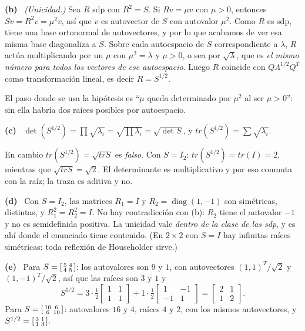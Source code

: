 \documentclass[11pt,a4paper]{article}
\newcommand{\bi}[1]{\boldsymbol{#1}}
\newcommand{\n}[1]{\boldsymbol{#1}}
\DeclareMathOperator{\gen}{span}
\DeclareMathOperator{\tr}{tr}
\DeclareMathOperator{\rg}{rg}
\DeclareMathOperator{\diag}{diag}
\def\n#1{#1}\def\bi#1{#1}\def\rg{rg}\def\tr{tr}\def\gen{span}%
\newcommand{\itemsol}[1]{\par\medskip\noindent\textbf{(#1)}\ \ignorespaces}
\begin{document}
\itemsol{b} \emph{(Unicidad.)} Sea $R$ sdp con $R^2=S$. Si $R\n v=\mu\n v$ con
$\mu>0$, entonces $S\n v=R^2\n v=\mu^2\n v$, así que $\n v$ es autovector de $S$
con autovalor $\mu^2$. Como $R$ es sdp, tiene una base ortonormal de
autovectores, y por lo que acabamos de ver esa misma base diagonaliza a $S$.
Sobre cada autoespacio de $S$ correspondiente a $\lambda$, $R$ actúa
multiplicando por un $\mu$ con $\mu^2=\lambda$ y $\mu>0$, o sea por
$\sqrt\lambda$, que es \emph{el mismo número para todos los vectores de ese
autoespacio}. Luego $R$ coincide con $Q\Lambda^{1/2}Q^T$ como transformación
lineal, es decir $R=S^{1/2}$.

El paso donde se usa la hipótesis es ``$\mu$ queda determinado por $\mu^2$ al ser
$\mu>0$'': sin ella habría dos raíces posibles por autoespacio.

\itemsol{c} $\det(S^{1/2})=\prod\sqrt{\lambda_i}=\sqrt{\prod\lambda_i}
=\sqrt{\det S}$, y $\tr(S^{1/2})=\sum\sqrt{\lambda_i}$.

En cambio $\tr(S^{1/2})=\sqrt{\tr S}$ es \emph{falso}. Con $S=I_2$:
$\tr(S^{1/2})=\tr(I)=2$, mientras que $\sqrt{\tr S}=\sqrt2$. El determinante es
multiplicativo y por eso conmuta con la raíz; la traza es aditiva y no.

\itemsol{d} Con $S=I_2$, las matrices $R_1=I$ y $R_2=\diag(1,-1)$ son simétricas,
distintas, y $R_1^2=R_2^2=I$. No hay contradicción con (b): $R_2$ tiene el
autovalor $-1$ y no es semidefinida positiva. La unicidad vale \emph{dentro de la
clase de las sdp}, y es ahí donde el enunciado tiene contenido. (En $2\times2$
con $S=I$ hay infinitas raíces simétricas: toda reflexión de Householder sirve.)

\itemsol{e} Para $S=\begin{bsmallmatrix}5&4\\4&5\end{bsmallmatrix}$: los
autovalores son $9$ y $1$, con autovectores $(1,1)^T/\sqrt2$ y $(1,-1)^T/\sqrt2$,
así que las raíces son $3$ y $1$ y
\[
S^{1/2}=3\cdot\tfrac12\begin{bmatrix}1&1\\ 1&1\end{bmatrix}
       +1\cdot\tfrac12\begin{bmatrix}1&-1\\ -1&1\end{bmatrix}
      =\begin{bmatrix}2&1\\ 1&2\end{bmatrix}.
\]
Para $S=\begin{bsmallmatrix}10&6\\6&10\end{bsmallmatrix}$: autovalores $16$ y
$4$, raíces $4$ y $2$, con los mismos autovectores, y
$S^{1/2}=\begin{bsmallmatrix}3&1\\1&3\end{bsmallmatrix}$.
\end{document}
